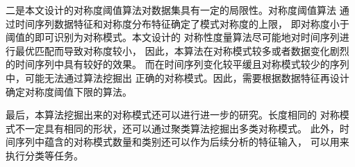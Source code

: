 二是本文设计的对称度阈值算法对数据集具有一定的局限性。对称度阈值算法
通过时间序列数据特征和对称度分布特征确定了模式对称度的上限，
即对称度小于阈值的即可识别为对称模式。本文设计的
对称性度量算法尽可能地对时间序列进行最优匹配而导致对称度较小，
因此，本算法在对称模式较多或者数据变化剧烈的时间序列中具有较好的效果。
而在时间序列变化较平缓且对称模式较少的序列中，可能无法通过算法挖掘出
正确的对称模式。因此，需要根据数据特征再设计确定对称度阈值下限的算法。

最后，本算法挖掘出来的对称模式还可以进行进一步的研究。长度相同的
对称模式不一定具有相同的形状，还可以通过聚类算法挖掘出多类对称模式。
此外，时间序列中蕴含的对称模式数量和类别还可以作为后续分析的特征输入，
可以用来执行分类等任务。




